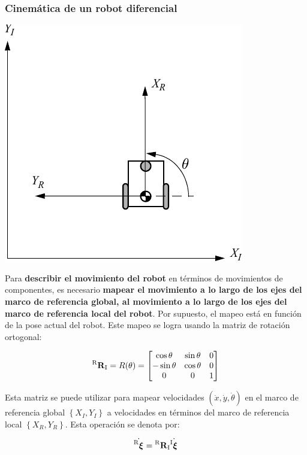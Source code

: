 \begin{frame}
    \frametitle{Cinemática de un robot diferencial}
    \scriptsize
    \begin{center}
        \includegraphics[width=0.2\columnwidth]{./images/coordinate_frame_rotation.pdf}
    \end{center}

    Para {\bf describir el movimiento del robot} en términos de movimientos de componentes, es necesario {\bf mapear el movimiento a lo largo de los ejes del marco de referencia global, al movimiento a lo largo de los ejes del marco de referencia local del robot}. Por supuesto, el mapeo está en función de la pose actual del robot. Este mapeo se logra usando la matriz de rotación ortogonal:

    \begin{equation*}
	    \prescript{\mathrm{R}}{}{{\boldsymbol{\mathbf{R}}}_\mathrm{I}} = R(\theta)=
	    \begin{bmatrix}
	        \cos\theta & \sin\theta & 0\\
	        -\sin \theta & \cos \theta & 0\\
	        0 & 0 & 1
	    \end{bmatrix}
	\end{equation*}

    Esta matriz se puede utilizar para mapear velocidades $(\dot{x}, \dot{y}, \dot{\theta})$ en el marco de referencia global $\left\lbrace X_I,Y_I \right\rbrace$ a velocidades en términos del marco de referencia local $\left\lbrace X_R,Y_R \right\rbrace$. Esta operación se denota por:
    
    \begin{equation*}
    	\dot{\prescript{\mathrm{R}}{}{{\boldsymbol{\mathbf{\xi}}}_\mathrm{}}} = \prescript{\mathrm{R}}{}{{\boldsymbol{\mathbf{R}}}_\mathrm{I}}\dot{\prescript{\mathrm{I}}{}{{\boldsymbol{\mathbf{\xi}}}_\mathrm{}}}
	\end{equation*}
\end{frame}

